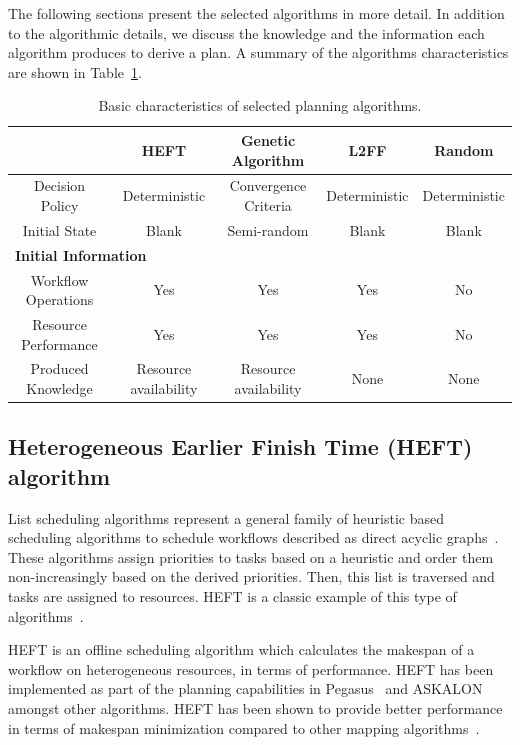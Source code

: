 The following sections present the selected algorithms in more detail.
In addition to the algorithmic details, we discuss the knowledge and the information each algorithm produces to derive a plan.
A summary of the algorithms characteristics are shown in Table~\ref{tab:sched_algo}.

\begin{table}[t]
    \centering
    \scriptsize
    \begin{tabular}{@{}ccccc@{}}
        \toprule
        &\textbf{HEFT}     &\textbf{Genetic Algorithm} &\textbf{L2FF} & \textbf{Random} \\
        \midrule
        Decision Policy   &Deterministic &Convergence Criteria &Deterministic& Deterministic\\
        Initial State    &Blank &Semi-random &Blank & Blank\\
        \midrule
        \multicolumn{5}{l}{\textbf{Initial Information}}\\\midrule
        Workflow Operations &Yes & Yes & Yes & No\\
        Resource Performance &Yes &Yes &Yes & No\\
        \midrule
        Produced Knowledge& Resource availability& Resource availability&None&None\\
        \bottomrule
    \end{tabular}
    \caption{Basic characteristics of selected planning algorithms.\label{tab:sched_algo}}
\end{table}

\subsection{Heterogeneous Earlier Finish Time (HEFT) algorithm}
\label{algo:heft}
List scheduling algorithms represent a general family of heuristic based scheduling algorithms to schedule workflows described as direct acyclic graphs~\cite{dong2006scheduling,list_sched_wiki}. 
These algorithms assign priorities to tasks based on a heuristic and order them non-increasingly based on the derived priorities.
Then, this list is traversed and tasks are assigned to resources.
HEFT is a classic example of this type of algorithms~\cite{dong2006scheduling}.

HEFT is an offline scheduling algorithm which calculates the makespan of a workflow on heterogeneous resources, in terms of performance.
HEFT has been implemented as part of the planning capabilities in Pegasus~\cite{deelman2015pegasus} and ASKALON~\cite{fahringer2005askalon} amongst other algorithms.
HEFT has been shown to provide better performance in terms of makespan minimization compared to other mapping algorithms~\cite{topcuoglu2002performance,fahringer2005askalon,canon2008comparative}. 

